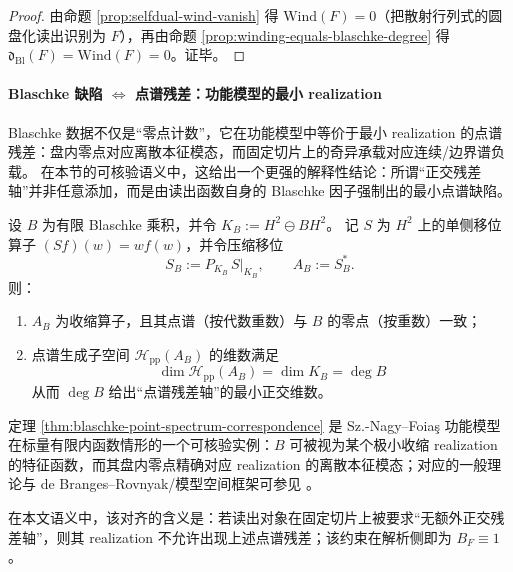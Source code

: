\begin{proof}
由命题 \ref{prop:selfdual-wind-vanish} 得 \(\mathrm{Wind}(F)=0\)（把散射行列式的圆盘化读出识别为 \(F\)），再由命题 \ref{prop:winding-equals-blaschke-degree} 得 \(\mathfrak d_{\mathrm{Bl}}(F)=\mathrm{Wind}(F)=0\)。证毕。
\end{proof}

\paragraph{Blaschke 缺陷 \texorpdfstring{$\Leftrightarrow$}{<->} 点谱残差：功能模型的最小 realization}
Blaschke 数据不仅是“零点计数”，它在功能模型中等价于最小 realization 的点谱残差：盘内零点对应离散本征模态，而固定切片上的奇异承载对应连续/边界谱负载。
在本节的可核验语义中，这给出一个更强的解释性结论：所谓“正交残差轴”并非任意添加，而是由读出函数自身的 Blaschke 因子强制出的最小点谱缺陷。

\begin{theorem}\label{thm:blaschke-point-spectrum-correspondence}
设 \(B\) 为有限 Blaschke 乘积，并令 \(K_B:=H^2\ominus BH^2\)。
记 \(S\) 为 \(H^2\) 上的单侧移位算子 \((Sf)(w)=wf(w)\)，并令压缩移位
\[
S_B:=P_{K_B}\,S|_{K_B},
\qquad
A_B:=S_B^\ast.
\]
则：
\begin{enumerate}
  \item \(A_B\) 为收缩算子，且其点谱（按代数重数）与 \(B\) 的零点（按重数）一致；
  \item 点谱生成子空间 \(\mathcal{H}_{\mathrm{pp}}(A_B)\) 的维数满足
  \[
  \boxed{\;\dim\mathcal{H}_{\mathrm{pp}}(A_B)=\dim K_B=\deg B\;}
  \]
  从而 \(\deg B\) 给出“点谱残差轴”的最小正交维数。
\end{enumerate}
\end{theorem}

\begin{remark}\label{rem:blaschke-characteristic-function-alignment}
定理 \ref{thm:blaschke-point-spectrum-correspondence} 是 Sz.-Nagy--Foia\c{s} 功能模型在标量有限内函数情形的一个可核验实例：\(B\) 可被视为某个极小收缩 realization 的特征函数，而其盘内零点精确对应 realization 的离散本征模态；对应的一般理论与 de Branges--Rovnyak/模型空间框架可参见 \cite{SzNagyFoiasBercoviciKerchy2010HarmonicAnalysis,Sarason1994SubHardyHilbertSpaces}。
\par
在本文语义中，该对齐的含义是：若读出对象在固定切片上被要求“无额外正交残差轴”，则其 realization 不允许出现上述点谱残差；该约束在解析侧即为 \(B_F\equiv 1\)。
\end{remark}

